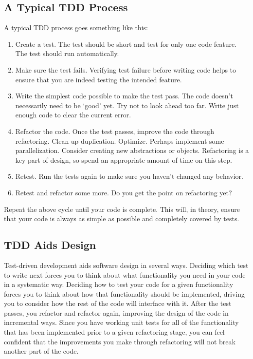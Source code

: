 \subsection{A Typical TDD Process}\label{tdd-classic}

A typical TDD process goes something like this:
\begin{enumerate}
\item Create a test. The test should be short and test for only one code feature. The test
  should run automatically.
\item Make sure the test fails. Verifying test failure before writing code helps to ensure
  that you are indeed testing the intended feature.
\item Write the simplest code possible to make the test pass. The code doesn't necessarily 
  need to be `good' yet.  Try not to look ahead too far. Write just enough code to clear 
  the current error.
\item Refactor the code. Once the test passes, improve the code through refactoring. 
  Clean up duplication. Optimize. Perhaps implement some parallelization. Consider creating new abstractions or
  objects.  Refactoring is a key part of design, so spend an appropriate amount of time on this step.
\item Retest. Run the tests again to make sure you haven't changed any behavior.
\item Retest and refactor some more. Do you get the point on refactoring yet?
\end{enumerate}

Repeat the above cycle until your code is complete. This will, in theory, ensure that your code is
always as simple as possible and completely covered by tests. 

\subsection{TDD Aids Design}
Test-driven development aids software design in several ways. Deciding which test to write next forces you
to think about what functionality you need in your code in a systematic way. Deciding how to test your code for
a given functionality forces you to think about how that functionality should be implemented, driving you to 
consider how the rest of the code will interface with it. After the test passes, you refactor and refactor again,
improving the design of the code in incremental ways. Since you have working unit tests for all of the functionality
that has been implemented prior to a given refactoring stage, you can feel confident that the improvements you make
through refactoring will not break another part of the code.

